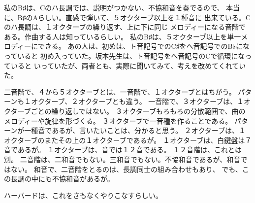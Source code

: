 \documentclass{jsarticle}
\begin{document}
    私のB♯は、Cのハ長調では、説明がつかない、不協和音を奏でるので、
    本当に、B♯のAらしい。直感で弾いて、５オクターブ以上を１種音に
    出来ている。Cのハ長調は、１オクターブの繰り返す、上に下に同じ
    メロディーになる音階である。作曲する人は知っているらしい。
    私のB♯は、５オクターブ以上を単一メロディーにできる。
    あの人は、初めは、ト音記号でのC♯をへ音記号でのB♭になっていると
    初め入っていた。坂本先生は、ト音記号をへ音記号のCで循環になっていると
    いっていたが、両者とも、実際に聞いてみて、考えを改めてくれていた。　


       二音階で、４から５オクターブとは、一音階で、１オクターブとはちがう。
    パターンも１オクターブ、２オクターブとも違う。
    一音階で、３オクターブは、１オクターブごとの繰り返しではない。
    ３オクターブもろもろの分散範囲で、曲のメロディーや旋律を形づくる。
    ３オクターブで一音種を作ることである。
    パターンが一種音であるが、言いたいことは、分かると思う。
    ２オクターブは、１オクターブのまたその上の１オクターブであるが。
    １オクターブは、白鍵盤は７音であるが。
    １オクターブは、音では１２音である。
    １２音階は、これとは別。
    二音階は、二和音でもない。三和音でもない。不協和音であるが、和音ではない。
    和音で、二音階をとるのは、長調同士の組み合わせもあり、
    でも、この長調の中にも不協和音があるが。


    ハーバードは、これをさもなくやりこなすらしい。
\end{document}
